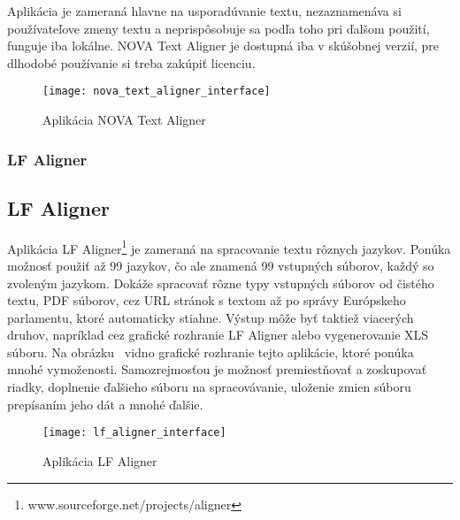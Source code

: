 Aplikácia je zameraná hlavne na usporadúvanie textu, nezaznamenáva si používateľove zmeny textu a neprispôsobuje sa podľa toho pri ďalšom použití, funguje iba lokálne. NOVA Text Aligner je dostupná iba v skúšobnej verzií, pre dlhodobé používanie si treba zakúpiť licenciu.

\begin{figure}[H]
	\begin{center}\texttt{[image: nova\_text\_aligner\_interface]}\end{center}
	\caption[Aplikácia NOVA Text Aligner]{Aplikácia NOVA Text Aligner\footnotemark}\label{fig:nova_text_aligner_interface}
\end{figure}

%
%
{
	\subsubsection{LF Aligner}
}
{
	\subsection{LF Aligner}
}
Aplikácia LF Aligner\footnote{www.sourceforge.net/projects/aligner} je zameraná na spracovanie textu rôznych jazykov. Ponúka možnosť použiť až 99 jazykov, čo ale znamená 99 vstupných súborov, každý so zvoleným jazykom. Dokáže spracovať rôzne typy vstupných súborov od čistého textu, PDF súborov, cez URL stránok s textom až po správy Európskeho parlamentu, ktoré automaticky stiahne. Výstup môže byť taktiež viacerých druhov, napríklad cez grafické rozhranie LF Aligner alebo vygenerovanie XLS súboru. Na obrázku~ vidno grafické rozhranie tejto aplikácie, ktoré ponúka mnohé vymoženosti. Samozrejmosťou je možnosť premiestňovať a zoskupovať riadky, doplnenie ďalšieho súboru na spracovávanie, uloženie zmien súboru prepísaním jeho dát a mnohé ďalšie.

\begin{figure}[H]
	\begin{center}\texttt{[image: lf\_aligner\_interface]}\end{center}
	\caption[Aplikácia LF Aligner]{Aplikácia LF Aligner}\label{fig:lf_aligner_interface}
\end{figure}

